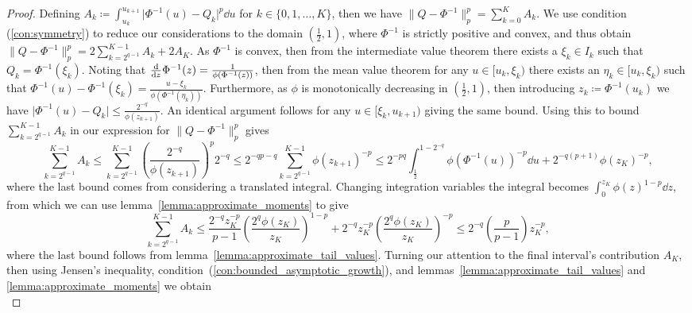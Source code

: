 \documentclass[manuscript,review]{acmart}
\begin{document}
\begin{proof} Defining $ A_k \coloneqq \int_{u_k}^{u_{k+1}} \lvert\Phi^{-1}(u) - Q_k\rvert^p \dd{u} $ for $ k \in \{0,1, \ldots, K\} $, then we have $ \lVert Q - \Phi^{-1} \rVert_p^p = \sum_{k=0}^{K} A_k $.  We use condition (\ref{con:symmetry}) to reduce our considerations to the domain $ (\tfrac{1}{2}, 1) $, where $ \Phi^{-1} $ is strictly positive and convex, and thus obtain $ \lVert Q - \Phi^{-1} \rVert_p^p = 2 \sum_{k=2^{q-1}}^{K-1} A_k + 2 A_K $. As $ \Phi^{-1} $ is convex, then from the intermediate value theorem there exists a $ \xi_k \in I_k $ such that $ Q_k = \Phi^{-1}(\xi_k) $. Noting that $ \dv{z} \Phi^{-1}(z) = \tfrac{1}{\phi(\Phi^{-1}(z))} $, then from the mean value theorem  for any $ u \in [u_k, \xi_k)$ there exists an $ \eta_k \in [u_k, \xi_k)$ such that $ \Phi^{-1}(u) - \Phi^{-1}(\xi_k) = \tfrac{u - \xi_k}{\phi(\Phi^{-1}(\eta_k))} $. Furthermore, as $ \phi $ is monotonically decreasing in $ (\tfrac{1}{2}, 1) $, then introducing $ z_k \coloneqq \Phi^{-1}(u_k) $ we have $ \lvert \Phi^{-1}(u) - Q_k\rvert \leq \tfrac{2^{-q}}{\phi(z_{k+1})}$. An identical argument follows for any $ u \in [\xi_k, u_{k+1})$ giving the same bound.  Using this to bound $ \sum_{k=2^{q-1}}^{K-1} A_k $ in our expression for $ \lVert Q - \Phi^{-1}\rVert_p^p $ gives
\begin{equation*}
\sum_{k=2^{q-1}}^{K-1} A_k 
\leq \sum_{k=2^{q-1}}^{K - 1} \left(\frac{2^{-q}}{\phi(z_{k+1})}\right)^p 2^{-q} 
\leq 2^{-qp - q} \sum_{k=2^{q-1}}^{K - 1}  \phi(z_{k+1})^{-p} 
\leq 2^{-pq} \int_{\frac{1}{2}}^{1 - 2^{-q}} \phi(\Phi^{-1}(u))^{-p} \dd{u} + 2^{-q(p+1)}\phi(z_K)^{-p},
\end{equation*}
where the last bound comes from considering a translated integral. Changing integration variables the integral becomes $  \int_{0}^{z_K} \phi(z)^{1-p} \dd{z} $, from which we can use lemma~\ref{lemma:approximate_moments} to give 
\begin{equation*}
\sum_{k=2^{q-1}}^{K-1} A_k 
\leq \frac{2^{-q} z_K^{-p}}{p-1} \left(\frac{2^q\phi(z_K)}{z_K}\right)^{1-p} + 2^{-q}z_K^{-p} \left(\frac{2^q\phi(z_K)}{z_K}\right)^{-p}
\leq 2^{-q} \left(\frac{p}{p-1}\right) z_K^{-p},
\end{equation*}
where the last bound follows from lemma~\ref{lemma:approximate_tail_values}. Turning our attention to the final interval's contribution $ A_K $, then using Jensen's inequality, condition~(\ref{con:bounded_asymptotic_growth}), and lemmas~\ref{lemma:approximate_tail_values} and \ref{lemma:approximate_moments} we obtain
\begin{equation*}

\end{equation*}
\end{proof}
\end{document}
